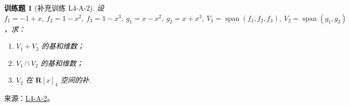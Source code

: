 \documentclass[12pt,fontset=fandol]{ctexart}
\newtheorem{exercise}{训练题}[section]
\begin{document}
\begin{exercise}[补充训练 L4-A-2]\label{prob:L4-A-2}
设 $f_1=-1+x,\ f_2=1-x^2,\ f_3=1-x^3,\ g_1=x-x^2,\ g_2=x+x^3,\ V_1=\operatorname{span}(f_1,f_2,f_3),\ V_2=\operatorname{span}(g_1,g_2)$，求：
        \begin{enumerate}
            \item $V_1+V_2$ 的基和维数；
            \item $V_1 \cap V_2$ 的基和维数；
            \item $V_2$ 在 $\mathbf{R}[x]_4$ 空间的补.
        \end{enumerate}
\end{exercise}
\noindent 来源：\href{https://github.com/yhwu-is/Linear-Algebra-Left-Undone/blob/new/%E8%AE%B2%E4%B9%89/%E4%B8%93%E9%A2%98/4%20%E7%BA%BF%E6%80%A7%E7%A9%BA%E9%97%B4%E7%9A%84%E8%BF%90%E7%AE%97.tex}{L4-A-2}。
\end{document}
